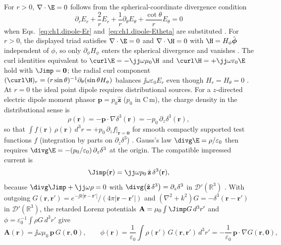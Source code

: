 For $r>0$, $\nabla\cdot\E=0$ follows from the spherical-coordinate divergence condition
\[
\partial_r E_r+\frac{2}{r}E_r+\frac{1}{r}\partial_\theta E_\theta+\frac{\cot\theta}{r}E_\theta=0
\]
when Eqs.~\eqref{eq:ch1.dipole-Er} and~\eqref{eq:ch1.dipole-Etheta} are substituted \cite{stratton1941}. For $r>0$, the displayed triad satisfies $\nabla\cdot\E=0$ and $\nabla\cdot\H=0$ with $\H=H_\phi\hat{\boldsymbol\phi}$ independent of $\phi$, so only $\partial_\phi H_\phi$ enters the spherical divergence and vanishes \cite{stratton1941,harrington2001}. The curl identities equivalent to $\curl\E=-\jj\omega\mu_0\H$ and $\curl\H=+\jj\omega\varepsilon_0\E$ hold with $\Jimp=\mathbf{0}$; the radial curl component $(\curl\H)_r=(r\sin\theta)^{-1}\partial_\theta(\sin\theta H_\phi)$ balances $\jj\omega\varepsilon_0 E_r$ even though $H_r=H_\theta=0$ \cite{stratton1941,harrington2001}. At $r=0$ the ideal point dipole requires distributional sources. For a $z$-directed electric dipole moment phasor $\mathbf{p}=p_0\hat{\mathbf{z}}$ ($p_0$ in C\,m), the charge density in the distributional sense is
\begin{equation}
\label{eq:ch1.dipole-rho-distributional}
\rho(\mathbf{r})=-\mathbf{p}\cdot\nabla\delta^{3}(\mathbf{r})
=-p_0\,\partial_z\delta^{3}(\mathbf{r}),
\end{equation}
so that $\int f(\mathbf{r})\,\rho(\mathbf{r})\,d^{3}r=+p_0\,\partial_z f|_{\mathbf{r}=\mathbf{0}}$ for smooth compactly supported test functions $f$ (integration by parts on $\partial_z\delta^{3}$) \cite{jackson1999,stratton1941}. Gauss's law $\divg\E=\rho/\varepsilon_0$ then requires $\divg\E=-(p_0/\varepsilon_0)\,\partial_z\delta^{3}$ at the origin. The compatible impressed current is
\begin{equation}
\label{eq:ch1.dipole-Jimp-distributional}
\Jimp(\mathbf{r})=\jj\omega p_0\,\hat{\mathbf{z}}\,\delta^{3}(\mathbf{r}),
\end{equation}
because $\divg\Jimp+\jj\omega\rho=0$ with $\divg\big(\hat{\mathbf{z}}\,\delta^{3}\big)=\partial_z\delta^{3}$ in $\mathcal{D}'(\mathbb{R}^{3})$ \cite{jackson1999,stratton1941}. With outgoing $G(\mathbf{r},\mathbf{r}')=e^{-\jj k|\mathbf{r}-\mathbf{r}'|}/(4\pi|\mathbf{r}-\mathbf{r}'|)$ and $(\nabla^2+k^2)G=-\delta^{3}(\mathbf{r}-\mathbf{r}')$ in $\mathcal{D}'(\mathbb{R}^{3})$, the retarded Lorenz potentials $\mathbf{A}=\mu_0\int\Jimp G\,d^3r'$ and $\phi=\varepsilon_0^{-1}\int\rho G\,d^3r'$ give
\begin{equation}
\label{eq:ch1.dipole-A-from-source}
\mathbf{A}(\mathbf{r})=\jj\omega\mu_0\,\mathbf{p}\,G(\mathbf{r},\mathbf{0}),
\qquad
\phi(\mathbf{r})=\frac{1}{\varepsilon_0}\int \rho(\mathbf{r}')\,G(\mathbf{r},\mathbf{r}')\,d^3r'
=-\frac{1}{\varepsilon_0}\,\mathbf{p}\cdot\nabla G(\mathbf{r},\mathbf{0}),
\end{equation}
